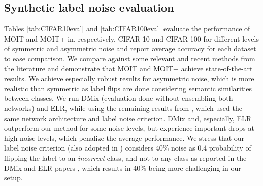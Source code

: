 \documentclass[final]{cvpr}
\begin{document}
\subsection{Synthetic label noise evaluation}

Tables \ref{tab:CIFAR10eval} and \ref{tab:CIFAR100eval} evaluate the performance of MOIT and MOIT+ in, respectively, CIFAR-10 and CIFAR-100 for different levels of symmetric and asymmetric noise and report average accuracy for each dataset to ease comparison. We compare against some relevant and recent methods from the literature \cite{2018_ICLR_mixup,2019_ICML_DynamicBootstrapping,2019_CVPR_JointOptimizImproved,2019_NeurIPS_LDMI,2020_ICLR_DivideMix,2020_NeurIPS_EarlyReg} and demonstrate that MOIT and MOIT+ achieve state-of-the-art results. We achieve especially robust results for asymmetric noise, which is more realistic than symmetric as label flips are done considering semantic similarities between classes. We run DMix (evaluation done without ensembling both networks) and ELR, while using the remaining results from \cite{2020_ICPR_SSLnoise}, which used the same network architecture and label noise criterion. DMix \cite{2020_ICLR_DivideMix} and, especially, ELR outperform our method for some noise levels, but experience important drops at high noise levels, which penalize the average performance. We stress that our label noise criterion (also adopted in \cite{2018_ICML_MentorNet, 2018_CVPR_IterativeNoise, 2020_ICPR_SSLnoise}) considers 40\% noise as 0.4 probability of flipping the label to an \textit{incorrect} class, and not to any class as reported in the DMix and ELR papers \cite{2020_ICLR_DivideMix,2020_NeurIPS_EarlyReg}, which results in 40\% being more challenging in our setup. 
\end{document}
